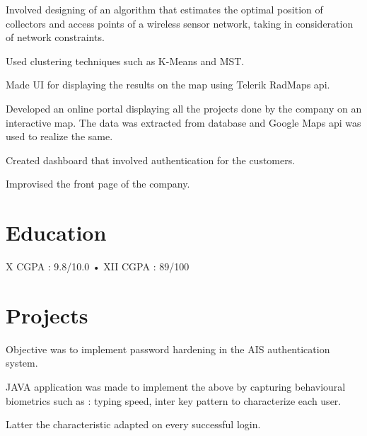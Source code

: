 \documentclass[]{deedy-resume-openfont}
\begin{document}
\begin{tightemize}
\item Involved designing of an algorithm that estimates the optimal position of collectors and access  points of a wireless sensor network, taking in consideration of network constraints.
\item Used clustering techniques such as K-Means and MST.
\item Made UI for displaying the results on the map using Telerik RadMaps api. 
\end{tightemize}
\sectionsep

\begin{tightemize}
\item Developed an online portal displaying all the projects done by the company on an interactive map. The data was extracted from database and Google Maps api was used to realize the same.
\item Created dashboard that involved authentication for the customers.
\item Improvised the front page of the company.
\end{tightemize}
\sectionsep


\section{Education}
\sectionsep

X CGPA : 9.8/10.0 • XII CGPA : 89/100
\sectionsep


\section{Projects}
\begin{tightemize}
\item Objective was to implement password hardening in the AIS authentication system.
\item JAVA application was made to implement the above by capturing behavioural biometrics such as : typing speed, inter key pattern to characterize each user.
\item Latter the characteristic adapted on every successful login.
\linebreak
\end{tightemize}
\sectionsep
\end{document}
